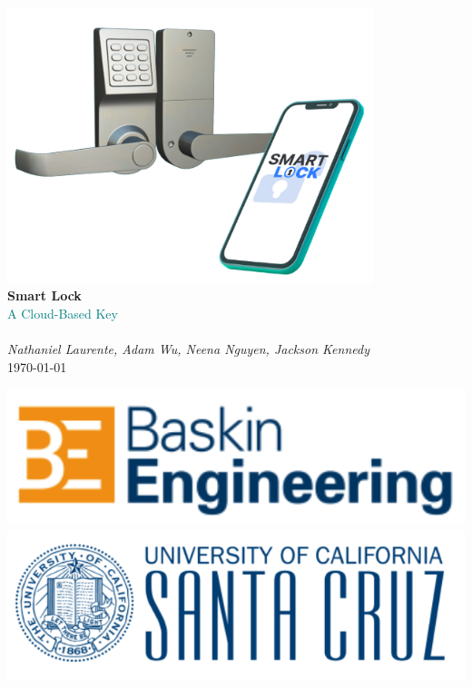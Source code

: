 \documentclass[a4paper,12pt]{article}
\begin{document}
\begin{titlepage}
    \begin{center}
        \vspace*{2cm}

        \includegraphics[width=0.8\textwidth]{./img/finalProduct.png}\\[1cm]

        {\Huge \textbf{Smart Lock}}\\[0.5cm]
        {\textcolor{teal}{\Large A Cloud-Based Key}}\\[1.5cm]

        {\LARGE \textbf{}}\\[0.5cm]
        {\Large \textit{Nathaniel Laurente, Adam Wu, Neena Nguyen, Jackson Kennedy}}\\[2cm]

        {\Large \today}
    \end{center}

    \vspace{2mm}
    \begin{center}
        \begin{minipage}{0.8\textwidth}
            \includegraphics[width=0.48\linewidth]{./img/bsoe.png}
            \hfill
            \includegraphics[width=0.48\linewidth]{./img/ucsc.png}
        \end{minipage}
    \end{center}
\end{titlepage}
\end{document}
